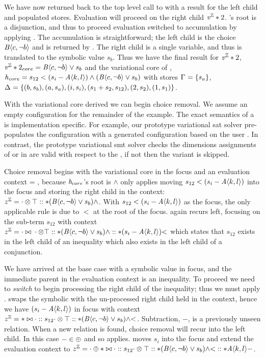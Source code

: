 We have now returned back to the top level call to \evAnd{} with a result for
the left child and populated stores. Evaluation will proceed on the right child
$\mathit{v^{\mathbb{Z}}}*{2}$. 's root is a disjunction, and thus to proceed evaluation
switched to accumulation by applying \evAcc{}. The accumulation is
straightforward; the left child is the choice $\chc[B]{c, \neg b}$ and is
returned by \acChc{}. The right child is a single variable, and thus is
translated to the symbolic value $s_{b}$. Thus we have the final result for
$\mathit{v^{\mathbb{Z}}}*{2}$, $\eIL*{2}_{core} = \chc[B]{c,\neg b} \vee{} s_{b}$ and the
variational core of \hV{}, $\hV{}_{core} = s_{12} < (s_{i} - \chc[A]{k,l})
\wedge{} (\chc[B]{c,\neg b} \vee{} s_{b})$ with stores $\eStore{}=\set{s_{a}}$,
$\aStore{}=\set{(b, s_{b}),(a,s_{a}),(i, s_{i}),(s_{1} + s_{2}, s_{12}),
  (2,s_{2}), (1,s_{1})}$.

With the variational core derived we can begin choice removal. We assume an
empty configuration for the remainder of the example. The exact semantics of a
\vc{} is implementation specific. For example, our prototype variational
\ac{sat} solver pre-populates the configuration with a generated configuration
based on the user \vc{}. In contrast, the prototype variational \ac{smt} solver
checks the dimensions assignments of \true{} or \false{} in \crChc{} are valid
with respect to the \vc{}, if not then the variant is skipped.

Choice removal begins with the variational core in the focus and an evaluation
context \zipper{} = \inRoot{}, because $\mathit{h}_{core}$'s root is $\wedge$ only
\crBool{} applies moving $s_{12} < (s_{i} - \chc[A]{k,l})$ into the focus and
storing the right child in the context: $\zipper =
\inBoolL*{\inRoot{}}{(\chc[B]{c,\neg b} \vee{} s_{b})}{\wedge}$. With $s_{12} <
(s_{i} - \chc[A]{k,l})$ as the focus, the only applicable rule is \crInEq{} due
to $<$ at the root of the focus. \crInEq{} again recurs left, focusing on the
sub-term $s_{12}$ with context $\zipper =
\inInEqL*{\inBoolL*{\inRoot{}}{(\chc[B]{c,\neg b} \vee{} s_{b})}{\wedge{}}}{(s_{i}
  - \chc[A]{k,l})}{<}$ which states that $s_{12}$ exists in the left child of an
inequality which also exists in the left child of a conjunction.

We have arrived at the base case with a symbolic value in focus, and the
immediate parent in the evaluation context is an inequality. To proceed we need
to \emph{switch} to begin processing the right child of the inequality; thus we
must apply \crInEqL{}. \crInEqL{} swaps the symbolic with the un-processed right
child held in the context, hence we have $(s_{i} - \chc[A]{k,l})$ in focus with
context $\zipper = \inInEqR*{s_{12}}{\inBoolL*{\inRoot{}}{(\chc[B]{c,\neg b}
    \vee{} s_{b})}{\wedge}}{<}$. Subtraction, $-$, is a previously unseen
relation. When a new relation is found, choice removal will recur into the left
child. In this case $- \in \oplus{}{}$ and so \crArith{} applies.
\crArith{} moves $s_{i}$ into the focus and extend the evaluation context to
$\zipper = \inArithL*{\inInEqR*{s_{12}}{\inBoolL*{\inRoot{}}{(\chc[B]{c,\neg b}
      \vee{} s_{b})}{\wedge}}{<}}{\chc[A]{k,l}}{-}$.

